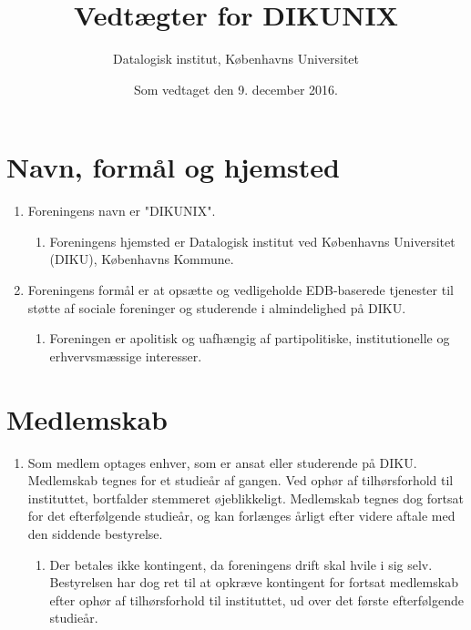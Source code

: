 \documentclass[a4paper]{article}
\title{Vedtægter for DIKUNIX}
\author{Datalogisk institut, Københavns Universitet}
\date{Som vedtaget den 9. december 2016.}
\newenvironment{afsnitenum}{
  \begin{enumerate}[series=afsnit, %
    label=\textsection~\arabic*., ref=\textsection~\arabic*]%
}{\end{enumerate}}
\newenvironment{stykenum}{
  \begin{enumerate}[%
    label=Stk.~\arabic*., ref=\theenumi~Stk.~\arabic*, start=2]
}{\end{enumerate}}
\begin{document}
\maketitle
\thispagestyle{first}

\section*{Navn, formål og hjemsted}

\begin{afsnitenum}

\item Foreningens navn er "DIKUNIX".

  \begin{stykenum}

  \item Foreningens hjemsted er Datalogisk institut ved Københavns Universitet
        (DIKU), Københavns Kommune.

  \end{stykenum}

\item Foreningens formål er at opsætte og vedligeholde EDB-baserede tjenester
til støtte af sociale foreninger og studerende i almindelighed på DIKU.

  \begin{stykenum}

  \item Foreningen er apolitisk og uafhængig af partipolitiske,
        institutionel\-le og erhvervsmæssige interesser.

  \end{stykenum}

\end{afsnitenum}


\section*{Medlemskab}

\begin{enumerate}[resume*=afsnit]

\item Som medlem optages enhver, som er ansat eller studerende på DIKU.
Medlemskab tegnes for et studieår af gangen. Ved ophør af tilhørsforhold til
instituttet, bortfalder stemmeret øjeblikkeligt.  Medlemskab tegnes dog fortsat
for det efterfølgende studieår, og kan forlænges årligt efter videre aftale med
den siddende bestyrelse.

  \begin{stykenum}

  \item Der betales ikke kontingent, da foreningens drift skal hvile i sig
        selv.  Bestyrelsen har dog ret til at opkræve kontingent for fortsat
        medlemskab efter ophør af tilhørsforhold til instituttet, ud over
        det første efterfølgende studieår.

\end{stykenum}

\end{enumerate}
\end{document}

